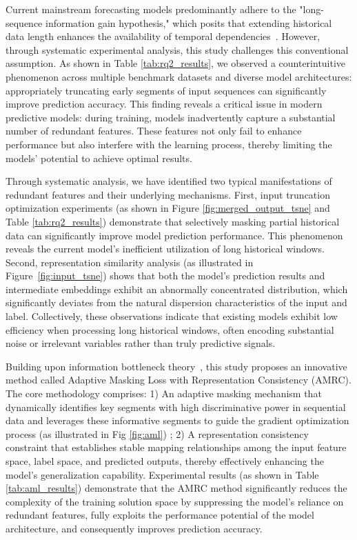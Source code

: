 \documentclass{article}
\begin{document}
Current mainstream forecasting models predominantly adhere to the "long-sequence information gain hypothesis," which posits that extending historical data length enhances the availability of temporal dependencies~\cite{transformer_effective, longtime}. However, through systematic experimental analysis, this study challenges this conventional assumption. As shown in Table \ref{tab:rq2_results}, we observed a counterintuitive phenomenon across multiple benchmark datasets and diverse model architectures: appropriately truncating early segments of input sequences can significantly improve prediction accuracy. This finding reveals a critical issue in modern predictive models: during training, models inadvertently capture a substantial number of redundant features. These features not only fail to enhance performance but also interfere with the learning process, thereby limiting the models' potential to achieve optimal results.

Through systematic analysis, we have identified two typical manifestations of redundant features and their underlying mechanisms. First, input truncation optimization experiments (as shown in Figure \ref{fig:merged_output_tsne} and Table \ref{tab:rq2_results}) demonstrate that selectively masking partial historical data can significantly improve model prediction performance. This phenomenon reveals the current model's inefficient utilization of long historical windows. Second, representation similarity analysis (as illustrated in Figure~\ref{fig:input_tsne}) shows that both the model's prediction results and intermediate embeddings exhibit an abnormally concentrated distribution, which significantly deviates from the natural dispersion characteristics of the input and label. Collectively, these observations indicate that existing models exhibit low efficiency when processing long historical windows, often encoding substantial noise or irrelevant variables rather than truly predictive signals.

Building upon information bottleneck theory~\cite{deep_learning_information_bottleneck, tishby2000informationbottleneckmethod, slonim1999agglomerative, hu2024survey}, this study proposes an innovative method called Adaptive Masking Loss with Representation Consistency (AMRC). The core methodology comprises: 1) An adaptive masking mechanism that dynamically identifies key segments with high discriminative power in sequential data and leverages these informative segments to guide the gradient optimization process (as illustrated in Fig \ref{fig:aml}) ;  
2) A representation consistency constraint that establishes stable mapping relationships among the input feature space, label space, and predicted outputs, thereby effectively enhancing the model's generalization capability. Experimental results (as shown in Table \ref{tab:aml_results}) demonstrate that the AMRC method significantly reduces the complexity of the training solution space by suppressing the model's reliance on redundant features, fully exploits the performance potential of the model architecture, and consequently improves prediction accuracy.
\end{document}
